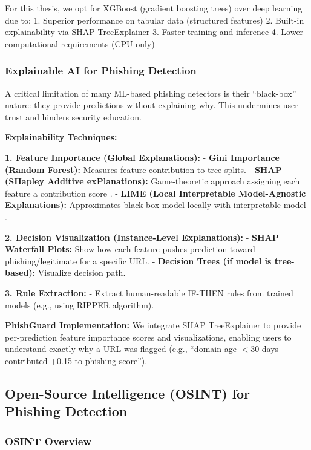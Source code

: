 For this thesis, we opt for XGBoost (gradient boosting trees) over deep
learning due to: 1. Superior performance on tabular data (structured
features) 2. Built-in explainability via SHAP TreeExplainer 3. Faster
training and inference 4. Lower computational requirements (CPU-only)

\subsubsection{Explainable AI for Phishing
Detection}\label{explainable-ai-for-phishing-detection}

A critical limitation of many ML-based phishing detectors is their
``black-box'' nature: they provide predictions without explaining why.
This undermines user trust and hinders security education.

\textbf{Explainability Techniques:}

\textbf{1. Feature Importance (Global Explanations):} - \textbf{Gini
Importance (Random Forest):} Measures feature contribution to tree
splits. - \textbf{SHAP (SHapley Additive exPlanations):} Game-theoretic
approach assigning each feature a contribution score \cite{lundberg2017}. -
\textbf{LIME (Local Interpretable Model-Agnostic Explanations):}
Approximates black-box model locally with interpretable model \cite{ribeiro2016}.

\textbf{2. Decision Visualization (Instance-Level Explanations):} -
\textbf{SHAP Waterfall Plots:} Show how each feature pushes prediction
toward phishing/legitimate for a specific URL. - \textbf{Decision Trees
(if model is tree-based):} Visualize decision path.

\textbf{3. Rule Extraction:} - Extract human-readable IF-THEN rules from
trained models (e.g., using RIPPER algorithm).

\textbf{PhishGuard Implementation:} We integrate SHAP TreeExplainer to
provide per-prediction feature importance scores and visualizations,
enabling users to understand exactly why a URL was flagged (e.g.,
``domain age $<$30 days contributed +0.15 to phishing score'').

\subsection{Open-Source Intelligence (OSINT) for Phishing
Detection}\label{open-source-intelligence-osint-for-phishing-detection}

\subsubsection{OSINT Overview}\label{osint-overview}

